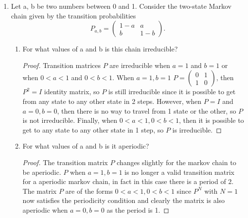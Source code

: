 \documentclass[a4paper]{article}
\begin{document}
\begin{enumerate}
\begin{proof}
  We know that that the probability is symmetric for a random walk starting from $q_{200}$, i.e. $q_{200} = \frac{1}{2}$. Since $q_i$ is a random walk,  and only depends on $q_{i+1}$,  we can see that the probability would continue to be symmetric. Notice that $$q_{i} = \frac{1}{2}q_{i-1} + \frac{1}{2} q_{i+1} \Rightarrow 2q_i = q_{i-1} + q_{i+1} \Rightarrow q_i - q_{i-1} = q_{i+1} - q_i$$. 
  This implies that the probability is an arthimetic series and thus the relationship between terms is linear as there is some constant $q_i = q_{i-1} + c, \forall i \in 1,\ldots,400$! Thus, $q_i = q_{0} + c \cdot i = 1 + c \cdot i$. Substitute, $i=400$
  \[
  q_{400} = 0 = 1 - c \cdot 400 \Rightarrow c = \frac{1}{400}
  .\] 
  and,
  \[
  q_i = 1 - \frac{i}{400}
  .\] 

Thus, $q_{100} =$ the number of steps from the $q_{400}$ over the total steps = $\frac{300}{400} = \frac{3}{4}$

\end{proof}
\item Let a, b be two numbers between 0 and 1. Consider the two-state Markov chain given by the
transition probabilities
\[
 P_{a,b}= \begin{pmatrix} 1 -a &  a \\ b & 1 - b \end{pmatrix}
.\] 
\begin{enumerate}
  \item For what values of a and b is this chain irreducible?
\begin{proof}
  Transition matrices $P$ are irreducible when $a=1$ and  $b=1$ or when  $0 < a < 1$ and  $0 < b < 1$. When $a=1, b=1$ $P = \begin{pmatrix} 0 &  1 \\ 1 & 0 \end{pmatrix}$, then $P^{2} = I$ identity matrix, so $P$ is still irreducible since it is possible to get from any state to any other state in 2 steps. However, when  $P = I$ and $a=0,b=0$, then there is no way to travel from 1 state or the other, so  $P$ is not irreducible. Finally, when $0 < a < 1, 0 < b<1$, then it is possible to get to any state to any other state in 1 step, so  $P$ is irreducible.
\end{proof}
  \item For what values of a and b is it aperiodic?
\begin{proof}
  The transition matrix $P$ changes slightly for the markov chain to be aperiodic. $P$ when $a=1, b=1$ is no longer a valid transition matrix for a aperiodic markov chain, in fact in this case there is a period of $2$. The matrix  $P$ are of the forms  $0 < a <1, 0 < b < 1$ since $P^{N}$ with $N = 1$ now satisfies the periodicity condition and clearly the matrix is also aperiodic when  $a =0, b=0$ as the period is 1.
\end{proof}


\end{enumerate}
\end{enumerate}
\end{document}
